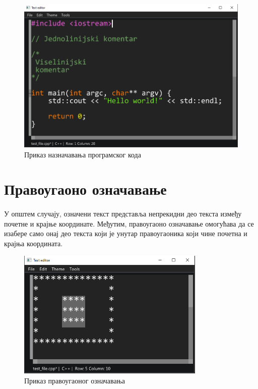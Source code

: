 \documentclass[12pt,oneside]{memoir}
\begin{document}
\begin{figure}[!ht]
	\centering
	\includegraphics[width=1.0\textwidth]{images/text_highlighting.png}
	\caption{Приказ назначавања програмског кода}
	\label{fig:text_highlighting}
\end{figure}


\section{Правоугаоно означавање}

\paragraph{}
У општем случају, означени текст представља непрекидни део текста
између почетне и крајње координате. Међутим, правоугаоно означавање
омогућава да се изабере само онај део текста који је унутар правоугаоника
који чине почетна и крајња координата. 

\begin{figure}[!ht]
	\centering
	\includegraphics[width=0.8\textwidth]{images/rectangular_selection.png}
	\caption{Приказ правоугаоног означавања}
	\label{fig:rectangular_selection}
\end{figure}
\end{document}
